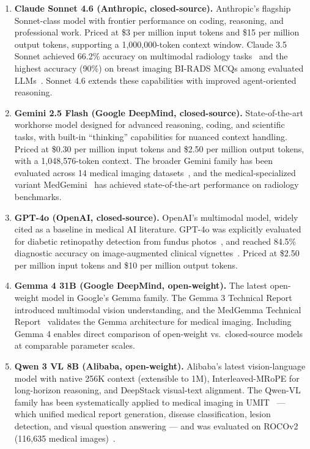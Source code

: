 \documentclass[11pt,a4paper]{article}
\begin{document}
\begin{enumerate}
    \item \textbf{Claude Sonnet 4.6 (Anthropic, closed-source).} Anthropic's flagship Sonnet-class model with frontier performance on coding, reasoning, and professional work. Priced at \$3 per million input tokens and \$15 per million output tokens, supporting a 1,000,000-token context window. Claude 3.5 Sonnet achieved 66.2\% accuracy on multimodal radiology tasks~\cite{preprints2025} and the highest accuracy (90\%) on breast imaging BI-RADS MCQs among evaluated LLMs~\cite{dir2025}. Sonnet 4.6 extends these capabilities with improved agent-oriented reasoning.

    \item \textbf{Gemini 2.5 Flash (Google DeepMind, closed-source).} State-of-the-art workhorse model designed for advanced reasoning, coding, and scientific tasks, with built-in ``thinking'' capabilities for nuanced context handling. Priced at \$0.30 per million input tokens and \$2.50 per million output tokens, with a 1,048,576-token context. The broader Gemini family has been evaluated across 14 medical imaging datasets~\cite{metaradiology2024}, and the medical-specialized variant MedGemini~\cite{saab2024gemini} has achieved state-of-the-art performance on radiology benchmarks.

    \item \textbf{GPT-4o (OpenAI, closed-source).} OpenAI's multimodal model, widely cited as a baseline in medical AI literature. GPT-4o was explicitly evaluated for diabetic retinopathy detection from fundus photos~\cite{jin2025mllm}, and reached 84.5\% diagnostic accuracy on image-augmented clinical vignettes~\cite{sciencedirect2024}. Priced at \$2.50 per million input tokens and \$10 per million output tokens.

    \item \textbf{Gemma 4 31B (Google DeepMind, open-weight).} The latest open-weight model in Google's Gemma family. The Gemma 3 Technical Report~\cite{gemma3} introduced multimodal vision understanding, and the MedGemma Technical Report~\cite{medgemma2025} validates the Gemma architecture for medical imaging. Including Gemma 4 enables direct comparison of open-weight vs.\ closed-source models at comparable parameter scales.

    \item \textbf{Qwen 3 VL 8B (Alibaba, open-weight).} Alibaba's latest vision-language model with native 256K context (extensible to 1M), Interleaved-MRoPE for long-horizon reasoning, and DeepStack visual-text alignment. The Qwen-VL family has been systematically applied to medical imaging in UMIT~\cite{umit2025} --- which unified medical report generation, disease classification, lesion detection, and visual question answering --- and was evaluated on ROCOv2 (116,635 medical images)~\cite{mdpi2025}.
\end{enumerate}
\end{document}

